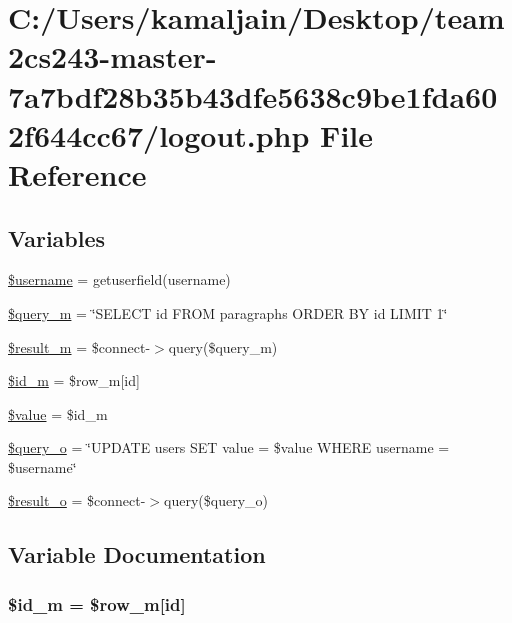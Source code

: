 \hypertarget{logout_8php}{}\section{C\+:/\+Users/kamaljain/\+Desktop/team2cs243-\/master-\/7a7bdf28b35b43dfe5638c9be1fda602f644cc67/logout.php File Reference}
\label{logout_8php}
\subsection*{Variables}
\begin{DoxyCompactItemize}
\item 
\hyperlink{logout_8php_a0eb82aa5f81cf845de4b36cd653c42cf}{\$username} = getuserfield(\textquotesingle{}username\textquotesingle{})
\item 
\hyperlink{logout_8php_ae329f02109ed78272a42886c98df3bd9}{\$query\+\_\+m} = \char`\"{}S\+E\+L\+E\+CT id F\+R\+OM paragraphs O\+R\+D\+ER BY id L\+I\+M\+IT 1\char`\"{}
\item 
\hyperlink{logout_8php_ad115cd7edecc850395803ef46988df70}{\$result\+\_\+m} = \$connect-\/$>$query(\$query\+\_\+m)
\item 
\hyperlink{logout_8php_aea52a0f9ed5911830c2cf44412b8e1ed}{\$id\+\_\+m} = \$row\+\_\+m\mbox{[}\textquotesingle{}id\textquotesingle{}\mbox{]}
\item 
\hyperlink{logout_8php_a0f298096f322952a72a50f98a74c7b60}{\$value} = \$id\+\_\+m
\item 
\hyperlink{logout_8php_aeabafca44a286021e5053d90b7ac02c2}{\$query\+\_\+o} = \char`\"{}U\+P\+D\+A\+TE users S\+ET value = \textquotesingle{}\$value\textquotesingle{} W\+H\+E\+RE username = \textquotesingle{}\$username\textquotesingle{}\char`\"{}
\item 
\hyperlink{logout_8php_abfea95b9a9b54de82d704c5e99871497}{\$result\+\_\+o} = \$connect-\/$>$query(\$query\+\_\+o)
\end{DoxyCompactItemize}


\subsection{Variable Documentation}
\subsubsection[{\texorpdfstring{\$id\+\_\+m}{$id_m}}]{\setlength{\rightskip}{0pt plus 5cm}\$id\+\_\+m = \$row\+\_\+m\mbox{[}\textquotesingle{}id\textquotesingle{}\mbox{]}}\hypertarget{logout_8php_aea52a0f9ed5911830c2cf44412b8e1ed}{}\label{logout_8php_aea52a0f9ed5911830c2cf44412b8e1ed}
